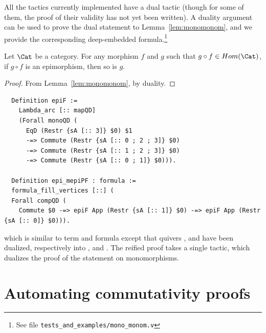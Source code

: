 \documentclass[a4paper,UKenglish,cleveref, autoref, thm-restate]{lipics-v2021}
\begin{document}
All the tactics currently implemented have a dual tactic (though for some of them, the proof of their validity has not yet been written). A duality argument can be used to prove the dual statement to Lemma~\ref{lem:monomonom}, and we provide the corresponding deep-embedded formula.\footnote{See file \texttt{tests\_and\_examples/mono\_monom.v}}

\begin{lemma}\label{lem:epimepi}
  Let $\Cat$ be a category. For any morphism $f$ and $g$ such that $g \circ f \in Hom(\Cat)$, if $g \circ f$ is an epimorphism, then so is $g$.
\end{lemma}

\begin{proof}
From Lemma~\ref{lem:monomonom}, by duality.
\end{proof}

\begin{verbatim}
  Definition epiF :=
    Lambda_arc [:: mapQD]
    (Forall monoQD (
      EqD (Restr {sA [:: 3]} $0) $1
      -=> Commute (Restr {sA [:: 0 ; 2 ; 3]} $0)
      -=> Commute (Restr {sA [:: 1 ; 2 ; 3]} $0)
      -=> Commute (Restr {sA [:: 0 ; 1]} $0))).

  Definition epi_mepiPF : formula :=
  formula_fill_vertices [::] (
  Forall compQD (
    Commute $0 -=> epiF App (Restr {sA [:: 1]} $0) -=> epiF App (Restr {sA [:: 0]} $0))).
\end{verbatim}
which is similar to term  and formula  except that quivers ,  and   have been dualized, respectively into ,  and . The reified proof takes a single tactic, which dualizes the proof of the statement on monomorphisms.





\section{Automating commutativity proofs}\label{sec:autocom}
\end{document}
